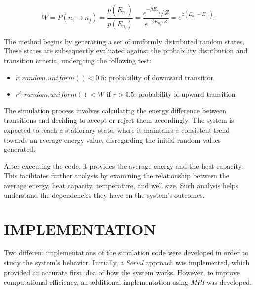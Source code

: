 \documentclass[%
 reprint,
 amsmath,amssymb,
 aps,
]{revtex4-2}
\begin{document}
\begin{equation}
       W=P\left(n_i \rightarrow n_j\right)=\frac{p\left(E_{n_j}\right)}{p\left(E_{n_i}\right)}=\frac{e^{-\beta E_{n_j}} / Z}{e^{-\beta E_{n_i} / Z}}=e^{\beta\left(E_{n_j}-E_{n_i}\right)}.
\end{equation}

The method begins by generating a set of uniformly distributed random states. These states are subsequently evaluated against the probability distribution and transition criteria, undergoing the following test:
\begin{itemize}
    \item $r: random.uniform()<0.5$: probability of downward transition
    \item $r': random.uniform()<W$ if $r>0.5$: probability of upward transition
\end{itemize}

The simulation process involves calculating the energy difference between transitions and deciding to accept or reject them accordingly. The system is expected to reach a stationary state, where it maintains a consistent trend towards an average energy value, disregarding the initial random values generated.

After executing the code, it provides the average energy and the heat capacity. This facilitates further analysis by examining the relationship between the average energy, heat capacity, temperature, and well size. Such analysis helps understand the dependencies they have on the system's outcomes.


\section{IMPLEMENTATION}
 \par
Two different implementations of the simulation code were developed in order to study the system's behavior. Initially, a \textit{Serial} approach was implemented, which provided an accurate first idea of how the system works. However, to improve computational efficiency, an additional implementation using \textit{MPI} was developed. 
\end{document}
